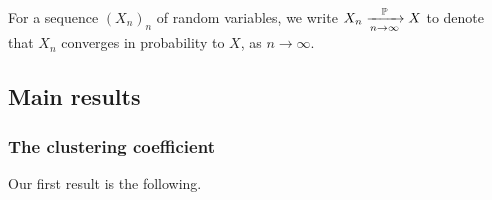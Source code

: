 For a sequence $(X_n)_n$ of random variables, we write $X_n \xrightarrow[n\to\infty]{\mathbb{P}} X$ to denote that $X_n$ converges in probability to $X$, as $n \to \infty$.



\subsection{Main results}\label{ssec:main_results}


\subsubsection{The clustering coefficient}

Our first result is the following.

